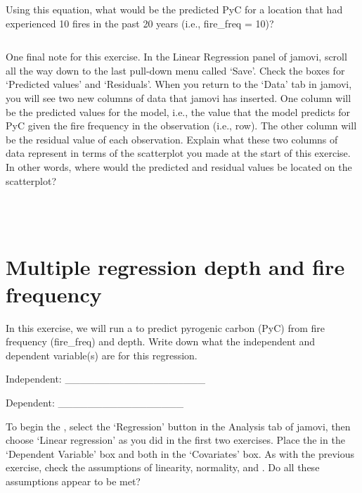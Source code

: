 \documentclass[
  openany]{krantz}
\begin{document}
Using this equation, what would be the predicted PyC for a location that had experienced 10 fires in the past 20 years (i.e., fire\_freq = 10)?

\begin{verbatim}

\end{verbatim}

One final note for this exercise.
In the Linear Regression panel of jamovi, scroll all the way down to the last pull-down menu called `Save'.
Check the boxes for `Predicted values' and `Residuals'.
When you return to the `Data' tab in jamovi, you will see two new columns of data that jamovi has inserted.
One column will be the predicted values for the model, i.e., the value that the model predicts for PyC given the fire frequency in the observation (i.e., row).
The other column will be the residual value of each observation.
Explain what these two columns of data represent in terms of the scatterplot you made at the start of this exercise.
In other words, where would the predicted and residual values be located on the scatterplot?

\begin{verbatim}



\end{verbatim}

\hypertarget{multiple-regression-depth-and-fire-frequency}{%
\section{Multiple regression depth and fire frequency}\label{multiple-regression-depth-and-fire-frequency}}

In this exercise, we will run a  to predict pyrogenic carbon (PyC) from fire frequency (fire\_freq) and depth.
Write down what the independent and dependent variable(s) are for this regression.

Independent: \_\_\_\_\_\_\_\_\_\_\_\_\_\_\_\_\_\_\_

Dependent: \_\_\_\_\_\_\_\_\_\_\_\_\_\_\_\_\_

To begin the , select the `Regression' button in the Analysis tab of jamovi, then choose `Linear regression' as you did in the first two exercises.
Place the  in the `Dependent Variable' box and both  in the `Covariates' box.
As with the previous exercise, check the  assumptions of linearity, normality, and .
Do all these assumptions appear to be met?
\end{document}
